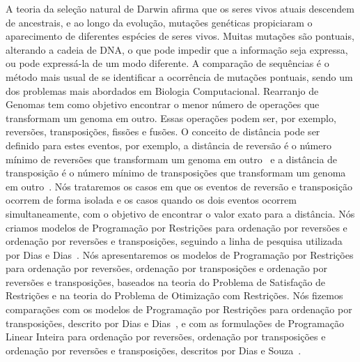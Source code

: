 A teoria da seleção natural de Darwin afirma que os seres vivos atuais
descendem de ancestrais, e ao longo da evolução, mutações genéticas
propiciaram o aparecimento de diferentes espécies de seres vivos. Muitas
mutações são pontuais, alterando a cadeia de DNA, o que pode impedir que
a informação seja expressa, ou pode expressá-la de um modo diferente. A
comparação de sequências é o método mais usual de se identificar a
ocorrência de mutações pontuais, sendo um dos problemas mais abordados
em Biologia Computacional. Rearranjo de Genomas tem como objetivo
encontrar o menor número de operações que transformam um genoma em
outro. Essas operações podem ser, por exemplo, reversões, transposições,
fissões e fusões. O conceito de distância pode ser definido para estes
eventos, por exemplo, a distância de reversão é o número mínimo de
reversões que transformam um genoma em outro~\cite{BafnaPevzner*1996} e
a distância de transposição é o número mínimo de transposições que
transformam um genoma em outro~\cite{BafnaPevzner*1998}. Nós trataremos
os casos em que os eventos de reversão e transposição ocorrem de forma
isolada e os casos quando os dois eventos ocorrem simultaneamente, com o
objetivo de encontrar o valor exato para a distância. Nós criamos
modelos de Programação por Restrições para ordenação por reversões e
ordenação por reversões e transposições, seguindo a linha de pesquisa
utilizada por Dias e Dias~\cite{DiasDias*2009}. Nós apresentaremos os
modelos de Programação por Restrições para ordenação por reversões,
ordenação por transposições e ordenação por reversões e transposições,
baseados na teoria do Problema de Satisfação de Restrições e na teoria
do Problema de Otimização com Restrições. Nós fizemos comparações com os
modelos de Programação por Restrições para ordenação por transposições,
descrito por Dias e Dias~\cite{DiasDias*2009}, e com as formulações de
Programação Linear Inteira para ordenação por reversões, ordenação por
transposições e ordenação por reversões e transposições, descritos por
Dias e Souza~\cite{DiasSouza*2007}.

